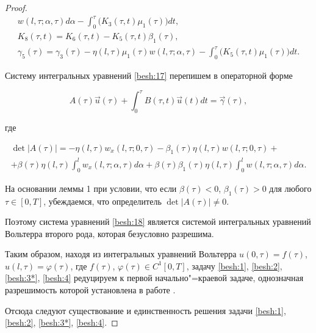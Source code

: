 \begin{proof}
\begin{gather*}
w(l,\tau;\alpha,\tau)d\alpha-\int^{\tau}_0\Big(K_{3}(\tau,t)\mu_{1}(\tau)\Big)dt,

\\

K_{8}(\tau,t)=K_{6}(\tau,t)-K_{5}(\tau,t)\beta_{1}(\tau),

\\

\gamma_{5}(\tau)=\gamma_{3}(\tau)-\eta(l,\tau)\mu_{1}(\tau)

w(l,\tau;\alpha,\tau)-\int^{\tau}_0\Big(K_{5}(\tau,t)\mu_{1}(\tau)\Big)dt.

\end{gather*}

Систему интегральных уравнений \eqref{besh:17} перепишем в операторной форме

\begin{equation}

A(\tau)\overrightarrow{u}(\tau)+\int^{\tau}_0B(\tau,t)\overrightarrow{u}(t)

dt=\overrightarrow{\gamma}(\tau), 

\label{besh:18}

\end{equation}

где

\begin{multline*}

\det| A(\tau)|=-\eta(l,\tau)w_{x}(l,\tau;0,\tau)-

\beta_{1}(\tau)\eta(l,\tau)w(l,\tau;0,\tau)+

\\

+\beta(\tau)\eta(l,\tau)\int^{l}_{0}

w_{x}(l,\tau;\alpha,\tau)d\alpha +

\beta(\tau)\beta_{1}(\tau)\eta(l,\tau)\int^{l}_{0}

w(l,\tau;\alpha,\tau)d\alpha.

\end{multline*}



На основании леммы 1 при условии, что если $\beta(\tau)<0$, $\beta_{1}(\tau)>0$ для любого $\tau \in [0, T]$, убеждаемся, что определитель $\det |A(\tau)|\neq 0$. 

Поэтому система уравнений \eqref{besh:18} является системой интегральных уравнений Вольтерра второго рода, которая безусловно разрешима. 

Таким образом, находя из интегральных уравнений Вольтерра $u(0,\tau)=f(\tau)$, $u(l,\tau)=\varphi(\tau)$, где $f(\tau)$, $\varphi(\tau) \in C^1[0, T]$, задачу \eqref{besh:1}, \eqref{besh:2}, \eqref{besh:3*}, \eqref{besh:4} редуцируем к первой начально"=краевой задаче, однозначная разрешимость которой установлена в работе \cite{besh:bib:Shhanukov}. 

Отсюда следуют существование и единственность решения задачи \eqref{besh:1}, \eqref{besh:2}, \eqref{besh:3*}, \eqref{besh:4}. \end{proof}



